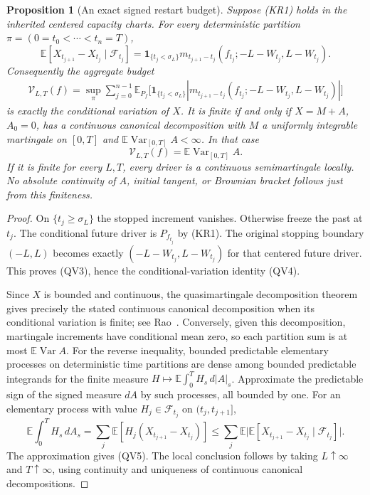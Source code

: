 \documentclass[11pt]{article}
\newtheorem{proposition}[theorem]{Proposition}
\theoremstyle{definition}\newtheorem{definition}[theorem]{Definition}
\theoremstyle{remark}\newtheorem{remark}[theorem]{Remark}
\begin{document}
\begin{proposition}[An exact signed restart budget]
\label{prop:continuum-quasimartingale}
Suppose (KR1) holds in the inherited centered capacity charts. For every
deterministic partition $\pi=(0=t_0<\cdots<t_n=T)$,
\[
 \mathbb E[X_{t_{j+1}}-X_{t_j}\mid\mathcal F_{t_j}]
 =\mathbf1_{\{t_j<\sigma_L\}}
 m_{t_{j+1}-t_j}(f_{t_j};-L-W_{t_j},L-W_{t_j}).
 \tag{QV3}
\]
Consequently the aggregate budget
\[
 \begin{split}
 \mathcal V_{L,T}(f)=\sup_\pi\sum_{j=0}^{n-1}\mathbb E_{P_f}\bigl[
  \mathbf1_{\{t_j<\sigma_L\}}
  |m_{t_{j+1}-t_j}(f_{t_j};-L-W_{t_j},L-W_{t_j})|\bigr]
 \end{split}
 \tag{QV4}
\]
is exactly the conditional variation of $X$. It is finite if and only if
$X=M+A$, $A_0=0$, has a continuous canonical decomposition with $M$ a uniformly
integrable martingale on $[0,T]$ and
$\mathbb E\operatorname{Var}_{[0,T]}A<\infty$. In that case
\[
 \mathcal V_{L,T}(f)=\mathbb E\operatorname{Var}_{[0,T]}A.
 \tag{QV5}
\]
If it is finite for every $L,T$, every driver is a continuous
semimartingale locally. No absolute continuity of $A$, initial tangent,
or Brownian bracket follows just from this finiteness.
\end{proposition}
\begin{proof}
On $\{t_j\ge\sigma_L\}$ the stopped increment vanishes. Otherwise freeze
the past at $t_j$. The conditional future driver is $P_{f_{t_j}}$ by
(KR1). The original stopping boundary $(-L,L)$ becomes exactly
$(-L-W_{t_j},L-W_{t_j})$ for that centered future driver. This proves
(QV3), hence the conditional-variation identity (QV4).

Since $X$ is bounded and continuous, the quasimartingale decomposition
theorem gives precisely the stated continuous canonical decomposition
when its conditional variation is finite; see Rao~\cite{rao}.
Conversely, given this decomposition, martingale increments have
conditional mean zero, so each partition sum is at most
$\mathbb E\operatorname{Var}A$.
For the reverse inequality, bounded predictable elementary processes on
deterministic time partitions are dense among bounded predictable
integrands for the finite measure
$H\mapsto\mathbb E\int_0^T H_s\,d|A|_s$.
Approximate the predictable sign of the signed measure $dA$ by such
processes, all bounded by one. For an elementary process with value
$H_j\in\mathcal F_{t_j}$ on $(t_j,t_{j+1}]$,
\[
 \mathbb E\int_0^T H_s\,dA_s
 =\sum_j\mathbb E[H_j(X_{t_{j+1}}-X_{t_j})]
 \le\sum_j\mathbb E\bigl|
     \mathbb E[X_{t_{j+1}}-X_{t_j}\mid\mathcal F_{t_j}]\bigr|.
\]
The approximation gives (QV5). The local conclusion follows by taking
$L\uparrow\infty$ and $T\uparrow\infty$, using continuity and uniqueness
of continuous canonical decompositions.
\end{proof}
\end{document}
